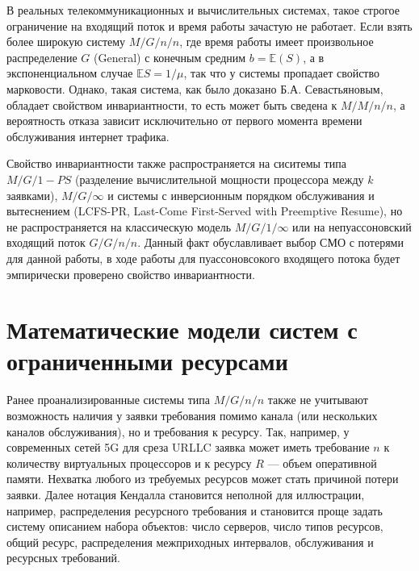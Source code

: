 В реальных телекоммуникационных и вычислительных системах, такое строгое ограничение на входящий поток и время работы зачастую не работает. Если взять более широкую систему $M/G/n/n$, где время работы имеет произвольное распределение $G$ (General) с конечным средним $b = \mathbb{E}(S)$, а в экспоненциальном случае $\mathbb{E}S = 1/\mu$, так что у системы пропадает свойство марковости. Однако, такая система, как было доказано Б.А. Севастьяновым\cite{sevastyanov1957_ergodic_refusals,burman1981_insensitivity}, обладает свойством инвариантности, то есть может быть сведена к $M/M/n/n$, а вероятность отказа зависит исключительно от первого момента времени обслуживания\cite{sevastyanov1957_ergodic_refusals,burman1981_insensitivity} интернет трафика. 

Свойство инвариантности также распространяется на сиситемы типа $M/G/1-PS$\cite{burman1981_insensitivity,adan_resing2015_queueing_systems} (разделение вычислительной мощности процессора между $k$ заявками), $M/G/\infty$ и системы с инверсионным порядком обслуживания и вытеснением (LCFS-PR, Last-Come First-Served with Preemptive Resume), но не распространяется на классическую модель $M/G/1/\infty$ или на непуассоновский входящий поток $G/G/n/n$. Данный факт обуславливает выбор СМО с потерями для данной работы, в ходе работы для пуассоновсокого входящего потока будет эмпирически проверено свойство инвариантности. 



\section{Математические модели систем с ограниченными ресурсами}
\label{sec:limited_resources}

Ранее проанализированные системы типа $M/G/n/n$ также не учитывают возможность наличия у заявки требования помимо канала (или нескольких каналов обслуживания), но и требования к ресурсу. Так, например, у современных сетей 5G для среза URLLC заявка может иметь требование $n$ к количеству виртуальных процессоров и к ресурсу $R$ --- объем оперативной памяти. Нехватка любого из требуемых ресурсов может стать причиной потери заявки. Далее нотация Кендалла становится неполной для иллюстрации, например, распределения ресурсного требования и становится проще задать систему описанием набора объектов: число серверов, число типов ресурсов, общий ресурс, распределения межприходных интервалов, обслуживания и ресурсных требований.

